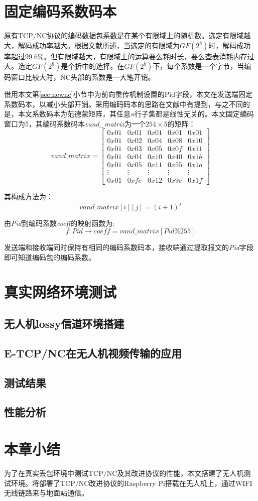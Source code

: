 \section{固定编码系数码本}
原有TCP/NC协议的编码数据包系数是在某个有限域上的随机数。选定有限域越大，解码成功率越大。根据文献\cite{4015738}所述，当选定的有限域为$GF\left(2^8\right)$时，解码成功率超过$99.6\%$。但有限域越大，有限域上的运算要么耗时长，要么查表消耗内存过大。选定$GF\left(2^8\right)$是个折中的选择。在$GF\left(2^8\right)$下，每个系数是一个字节，当编码窗口比较大时，NC头部的系数是一大笔开销。
\par
借用本文第\ref{sec:newnc}小节中为前向重传机制设置的Pid字段，本文在发送端固定系数码本，以减小头部开销。采用编码码本的思路在文献\cite{宋蒙2015基于网络编码的}中有提到，与之不同的是，本文系数码本为范德蒙矩阵，其任意\emph{n}行子集都是线性无关的。本文固定编码窗口为5，其编码系数码本\emph{vand\_matrix}为一个$254 \times 5$的矩阵：
\begin{equation}
	vand\_matrix=\left[ {\begin{array}{*{20}{c}}
		{0x01}&{0x01}&{0x01}&{0x01}&{0x01}\\
		{0x01}&{0x02}&{0x04}&{0x08}&{0x10}\\
		{0x01}&{0x03}&{0x05}&{0x0f}&{0x11}\\
		{0x01}&{0x04}&{0x10}&{0x40}&{0x1b}\\
		{0x01}&{0x05}&{0x11}&{0x55}&{0x1a}\\
		{\vdots}&{\vdots}&{\vdots}&{\vdots}&{\vdots}\\
		{0x01}&{0xfe}&{0x12}&{0x9e}&{0x1f}
		\end{array}} \right]
\end{equation}
\par
其构成方法为：
\begin{equation}
	vand\_matrix[i][j]=(i+1)^j
\end{equation}
\par
由\emph{Pid}到编码系数\emph{coeff}的映射函数为:
\begin{equation}
	f:Pid \rightarrow coeff=vand\_matrix[Pid\%255]
\end{equation}
\par
发送端和接收端同时保持有相同的编码系数码本，接收端通过提取报文的\emph{Pid}字段即可知道编码包的编码系数。
\section{真实网络环境测试}
\subsection{无人机lossy信道环境搭建}
\subsection{E-TCP/NC在无人机视频传输的应用}
\subsection{测试结果}
\subsection{性能分析}
\section{本章小结}
为了在真实丢包环境中测试TCP/NC及其改进协议的性能，本文搭建了无人机测试环境。将部署了TCP/NC改进协议的Raspberry Pi搭载在无人机上，通过WIFI无线链路来与地面站通信。 